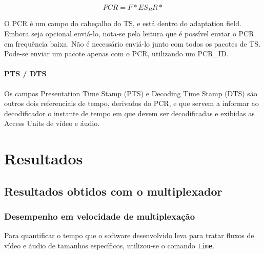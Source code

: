 \documentclass[
	12pt,				%
	openright,			%
	twoside,			%
	a4paper,			%
	english,			%
	french,				%
	brazil				%
	]{abntex2}
\begin{document}
\begin{equation}

PCR = F * ES_BR * 

\end{equation}

O PCR é um campo do cabeçalho do TS, e está dentro do adaptation field. Embora seja opcional enviá-lo,
nota-se pela leitura que é possível enviar o PCR em frequência baixa. Não é necessário enviá-lo junto
com todos os pacotes de TS. Pode-se enviar um pacote apenas com o PCR, utilizando um PCR_ID.


\subsection{PTS / DTS}

Os campos Presentation Time Stamp (PTS) e Decoding Time Stamp (DTS) são outros dois referenciais de tempo,
derivados do PCR, e que servem a informar ao decodificador o instante de tempo em que devem ser decodificadas
e exibidas as Access Units de vídeo e áudio. 





\part{Resultados}

\chapter{Resultados obtidos com o multiplexador}

\section{Desempenho em velocidade de multiplexação}

Para quantificar o tempo que o software desenvolvido leva para tratar fluxos de vídeo e áudio de tamanhos específicos, utilizou-se o comando \texttt{time}.


%
%
\end{document}
